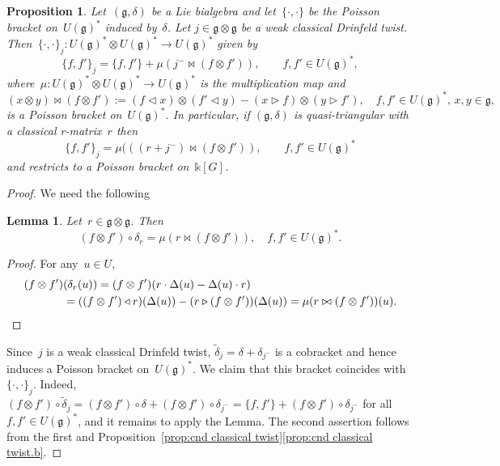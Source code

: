 \documentclass[12pt, reqno]{amsart}
\newtheorem{lemma}[theorem]{Lemma}
\newtheorem{proposition}[theorem]{Proposition}
\theoremstyle{definition}
\numberwithin{equation}{section}
\newcommand{\tensor}{\otimes}
\newcommand{\kk}{\mathbb{k}}\newcommand{\lie}[1]{{\mathfrak{#1}}}
\begin{document}
\begin{proposition}\label{prop:pois twist}
Let~$(\lie g,\delta)$ be a Lie bialgebra and let~$\{\cdot,\cdot\}$ be
the Poisson bracket on~$ U(\lie g)^*$ induced by~$\delta$.
Let $j \in\lie g\tensor\lie g$
be a weak classical Drinfeld twist. Then~$\{\cdot,\cdot\}_{ j }: U(\lie g)^*\tensor  U(\lie g)^*\to 
 U(\lie g)^*$ given by
\begin{equation}\label{eq:pois twist}
\{f,f'\}_{ j }=\{f,f'\}+\mu(  j ^-\bowtie (f\tensor f')),\qquad f,f'\in  U(\lie g)^*,
\end{equation}
where~$\mu:  U(\lie g)^* \tensor   U(\lie g)^* \to   U(\lie g)^* $ is the multiplication map and $$(x\tensor y)\bowtie (f\tensor f'):=(f\triangleleft x)\tensor (f'\triangleleft y)-(x\triangleright f)\tensor (y\triangleright f'),
\quad 
f,f'\in   U(\lie g)^* ,\, x,y\in\lie g,
$$
is a Poisson bracket on~$  U(\lie g)^* $. In particular, if $(\lie g,\delta)$
is quasi-triangular with a classical r-matrix~$r$ then
$$
\{f,f'\}_{ j }=\mu(((r+ j ^-)\bowtie (f\tensor f')),
\qquad f,f'\in   U(\lie g)^* 
$$
and restricts to a Poisson bracket on~$\kk[G]$.
\end{proposition}
\begin{proof}
We need the following 
\begin{lemma}
Let~$r\in\lie g\tensor\lie g$. Then
$$
(f\tensor f')\circ\delta_{r}=\mu(r\bowtie (f\tensor f')),\quad f,f'\in   U(\lie g)^* .
$$
\end{lemma}
\begin{proof}
For any~$u\in U$,
\begin{align*}
(f\tensor f')&(\delta_{r}(u))=
(f\tensor f')(r\cdot \Delta(u)-\Delta(u)\cdot r)\\
&=((f\tensor f')\triangleleft r)(\Delta(u))-
(r\triangleright (f\tensor f'))(\Delta(u))=\mu(r\bowtie (f\tensor f'))(u). \qedhere
\end{align*}
\end{proof}
Since~$ j $ is a weak classical Drinfeld twist, $\tilde\delta_{ j }=\delta+\delta_{ j ^-}$ is a cobracket and hence induces a Poisson bracket on~$  U(\lie g)^* $. We claim that this bracket coincides with~$\{\cdot,\cdot\}_{ j }$. 
Indeed, $(f\tensor f')\circ \tilde\delta_{ j }
=(f\tensor f')\circ \delta+(f\tensor f')\circ \delta_{ j ^-}=
\{f,f'\}+(f\tensor f')\circ\delta_{ j ^-}$ for all~$f,f'\in   U(\lie g)^* $, and it remains to
apply the Lemma. The second assertion follows from the first and Proposition~\ref{prop:cnd classical twist}\ref{prop:cnd classical twist.b}.
\end{proof}
\end{document}
